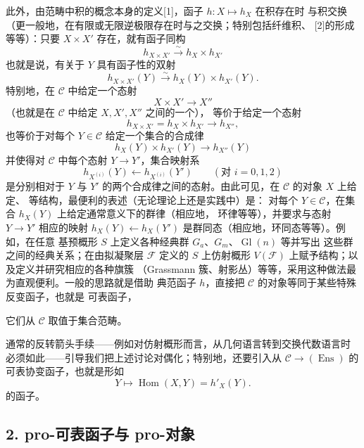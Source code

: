 此外，由范畴中积的概念本身的定义[1]，函子 $h:X\longmapsto h_X$ 在积存在时
与积交换（更一般地，在有限或无限逆极限存在时与之交换；特别包括纤维积、
[2]的形成等等）：只要 $X\times X'$ 存在，就有函子同构
\[
  h_{X\times X'}\xrightarrow{\sim}h_X\times h_{X'}
\]
也就是说，有关于 $Y$ 具有函子性的双射
\[
  h_{X\times X'}(Y)\xrightarrow{\sim}h_X(Y)\times h_{X'}(Y).
\]
特别地，在 $\mathcal C$ 中给定一个态射
\[
  X\times X'\longrightarrow X''
\]
（也就是在 $\mathcal C$ 中给定 $X,X',X''$ 之间的一个），
等价于给定一个态射
\[
  h_{X\times X'}=h_X\times h_{X'}\longrightarrow h_{X''},
\]
也等价于对每个 $Y\in\mathcal C$ 给定一个集合的合成律
\[
  h_X(Y)\times h_{X'}(Y)\longrightarrow h_{X''}(Y)
\]
并使得对 $\mathcal C$ 中每个态射 $Y\longrightarrow Y'$，集合映射系
\[
  h_{X^{(i)}}(Y)\longleftarrow h_{X^{(i)}}(Y')
  \qquad(\text{对 }i=0,1,2)
\]
是分别相对于 $Y$ 与 $Y'$ 的两个合成律之间的态射。由此可见，在
$\mathcal C$ 的对象 $X$ 上给定、
等结构，最便利的表述（无论理论上还是实践中）是：
对每个 $Y\in\mathcal C$，在集合 $h_X(Y)$ 上给定通常意义下的群律（相应地，
环律等等），并要求与态射 $Y\longrightarrow Y'$ 相应的映射
$h_X(Y)\longleftarrow h_X(Y')$ 是群同态（相应地，环同态等等）。例如，在任意
基预概形 $S$ 上定义各种经典群 $G_a$、$G_m$、$\operatorname{Gl}(n)$ 等并写出
这些群之间的经典关系；在由拟凝聚层 $\mathcal F$ 定义的 $S$ 上仿射概形
$V(\mathcal F)$ 上赋予结构；以及定义并研究相应的各种旗簇
（Grassmann 簇、射影丛）等等，采用这种做法最为直观便利。一般的思路就是借助
典范函子 $h$，直接把 $\mathcal C$ 的对象等同于某些特殊反变函子，也就是
可表函子，

它们从 $\mathcal C$ 取值于集合范畴。

通常的反转箭头手续——例如对仿射概形而言，从几何语言转到交换代数语言时
必须如此——引导我们把上述讨论对偶化；特别地，还要引入从
$\mathcal C\longrightarrow(\operatorname{Ens})$ 的可表协变函子，也就是形如
\[
  Y\longmapsto\operatorname{Hom}(X,Y)=h'_X(Y).
\]
的函子。

\subsection*{2. pro-可表函子与 pro-对象}

